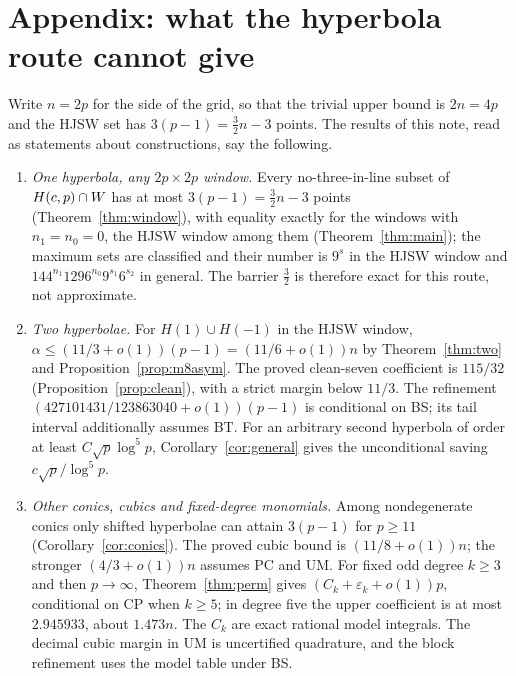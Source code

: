 \section*{Appendix: what the hyperbola route cannot give}\label{app:hyperbolae}

Write $n=2p$ for the side of the grid, so that the trivial upper bound is $2n=4p$ and the HJSW set has $3(p-1)=\tfrac32 n-3$ points.
The results of this note, read as statements about constructions, say the following.

\begin{enumerate}
\item[(a)] \emph{One hyperbola, any $2p\times2p$ window.}  Every no-three-in-line subset of $H(c,p)\cap W$ has at most $3(p-1)=\tfrac32 n-3$ points
 (Theorem~\ref{thm:window}), with equality exactly for the windows with $n_1=n_0=0$, the HJSW window among them (Theorem~\ref{thm:main});
 the maximum sets are classified and their number is $9^s$ in the HJSW window and $144^{n_1}1296^{n_0}9^{s_1}6^{s_2}$ in general.
 The barrier $\tfrac32$ is therefore exact for this route, not approximate.
\item[(b)] \emph{Two hyperbolae.}  For $H(1)\cup H(-1)$ in the HJSW window,
$\alpha\le(11/3+o(1))(p-1)=(11/6+o(1))n$ by Theorem~\ref{thm:two} and Proposition~\ref{prop:m8asym}.
The proved clean-seven coefficient is $115/32$ (Proposition~\ref{prop:clean}), with a strict margin below $11/3$.
The refinement $(427101431/123863040+o(1))(p-1)$ is conditional on BS; its tail interval additionally assumes BT.
For an arbitrary second hyperbola of order at least $C\sqrt p\log^5p$, Corollary~\ref{cor:general} gives the unconditional saving $c\sqrt p/\log^5p$.
\item[(c)] \emph{Other conics, cubics and fixed-degree monomials.}
Among nondegenerate conics only shifted hyperbolae can attain $3(p-1)$ for $p\ge11$ (Corollary~\ref{cor:conics}).
The proved cubic bound is $(11/8+o(1))n$; the stronger $(4/3+o(1))n$ assumes PC and UM.
For fixed odd degree $k\ge3$ and then $p\to\infty$, Theorem~\ref{thm:perm} gives $(C_k+\varepsilon_k+o(1))p$, conditional on CP when $k\ge5$;
in degree five the upper coefficient is at most $2.945933$, about $1.473n$.
The $C_k$ are exact rational model integrals.  The decimal cubic margin in UM is uncertified quadrature, and the block refinement uses the model table under BS.
\end{enumerate}

